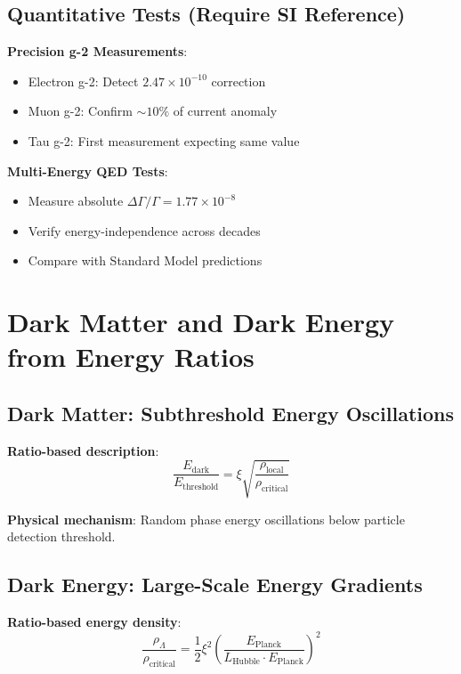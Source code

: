 \documentclass[12pt,a4paper]{article}
\newcommand{\Efield}{E}
\newcommand{\xipar}{\xi}
\theoremstyle{definition}
\theoremstyle{remark}
\begin{document}
	\subsection{Quantitative Tests (Require SI Reference)}
	
	\textbf{Precision g-2 Measurements}:
	\begin{itemize}
		\item Electron g-2: Detect $2.47 \times 10^{-10}$ correction
		\item Muon g-2: Confirm $\sim 10\%$ of current anomaly
		\item Tau g-2: First measurement expecting same value
	\end{itemize}
	
	\textbf{Multi-Energy QED Tests}:
	\begin{itemize}
		\item Measure absolute $\Delta\Gamma/\Gamma = 1.77 \times 10^{-8}$
		\item Verify energy-independence across decades
		\item Compare with Standard Model predictions
	\end{itemize}
	
	\section{Dark Matter and Dark Energy from Energy Ratios}
	
	\subsection{Dark Matter: Subthreshold Energy Oscillations}
	
	\textbf{Ratio-based description}:
	\begin{equation}
		\frac{\Efield_{\text{dark}}}{\Efield_{\text{threshold}}} = \xipar \sqrt{\frac{\rho_{\text{local}}}{\rho_{\text{critical}}}}
	\end{equation}
	
	\textbf{Physical mechanism}: Random phase energy oscillations below particle detection threshold.
	
	\subsection{Dark Energy: Large-Scale Energy Gradients}
	
	\textbf{Ratio-based energy density}:
	\begin{equation}
		\frac{\rho_{\Lambda}}{\rho_{\text{critical}}} = \frac{1}{2} \xipar^2 \left(\frac{E_{\text{Planck}}}{L_{\text{Hubble}} \cdot E_{\text{Planck}}}\right)^2
	\end{equation}
	
\end{document}
